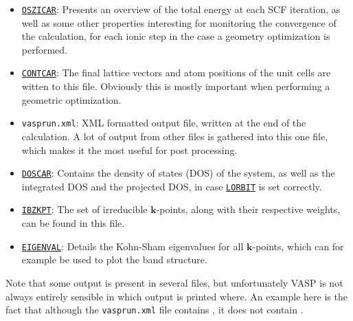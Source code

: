 \begin{refsection}
\begin{itemize}
 \label{appendix:sec-OSZICAR} 
\item \href{https://www.vasp.at/wiki/index.php/OSZICAR}{\texttt{OSZICAR}}: 
Presents an overview of the total energy at each SCF iteration, as well 
as some other properties interesting for monitoring the convergence of the 
calculation, for each ionic step in the case a geometry optimization is performed.

 \label{appendix:sec-CONTCAR} 
\item \href{https://www.vasp.at/wiki/index.php/CONTCAR}{\texttt{CONTCAR}}: 
The final lattice vectors and atom positions of the unit cells are witten to 
this file. Obviously this is mostly important when performing a geometric 
optimization.

 \label{appendix:sec-vasprun} 
\item \texttt{vasprun.xml}: 
XML formatted output file, written at the end of the calculation. A lot of 
output from other files is gathered into this one file, which makes it the 
most useful for post processing.

 \label{appendix:sec-DOSCAR} 
\item \href{https://www.vasp.at/wiki/index.php/DOSCAR}{\texttt{DOSCAR}}:
Contains the density of states (DOS) of the system, as well as the integrated \gls{DOS} 
and the projected \gls{DOS}, in case \href{https://www.vasp.at/wiki/index.php/LORBIT}{\texttt{LORBIT}} is set correctly.

 \label{appendix:sec-IBZKPT} 
\item \href{https://www.vasp.at/wiki/index.php/IBZKPT}{\texttt{IBZKPT}}: 
The set of irreducible $\mathbf{k}$-points, along with their respective 
weights, can be found in this file.

 \label{appendix:sec-EIGENVAL} 
\item \href{https://www.vasp.at/wiki/index.php/EIGENVAL}{\texttt{EIGENVAL}}: 
Details the Kohn-Sham eigenvalues for all $\mathbf{k}$-points, which can 
for example be used to plot the band structure. 

\end{itemize} 

Note that some output is present in several files, but unfortunately 
\gls{VASP} is not always entirely sensible in which output is printed where. 
An example here is the fact that although the \texttt{vasprun.xml} file 
contains , it does not 
contain . 
 

\end{refsection}
